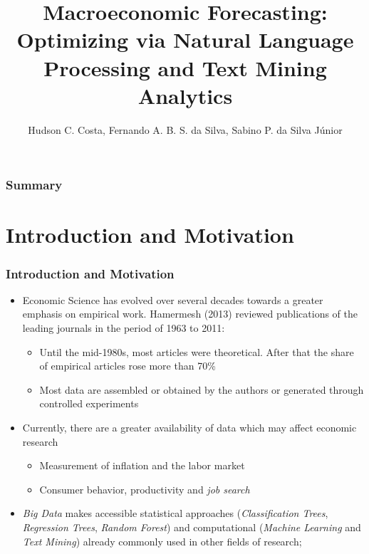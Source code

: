 \documentclass[aspectratio=169]{beamer}
\title[\sc{}]{Macroeconomic Forecasting: Optimizing via Natural Language Processing and Text Mining Analytics}
\author{Hudson C. Costa, Fernando A. B. S. da Silva, Sabino P. da Silva Júnior}
\institute{Data Pier and IBMEC/MG, Department of Statistics/UFRGS, PPGE/UFRGS}
\date{}
\begin{document}



\begin{frame}
  \titlepage
\end{frame}

\begin{frame}[plain]\frametitle{Summary}
\small\tableofcontents
\end{frame}

\section{Introduction and Motivation}

\begin{frame}\frametitle{Introduction and Motivation}
  \begin{itemize}
  \item Economic Science has evolved over several decades towards a greater emphasis on empirical work. Hamermesh (2013) reviewed publications of the leading journals in the period of 1963 to 2011:
  
    \begin{itemize}
      \item Until the mid-1980s, most articles were theoretical. After that the share of empirical articles rose more than 70\% 
      \item Most data are assembled or obtained by the authors or generated through controlled experiments 
    \end{itemize}
  \item Currently, there are a greater availability of data which may affect economic research
    \begin{itemize}
      \item Measurement of inflation and the labor market
       \item  Consumer behavior, productivity and \emph{job search}
    \end{itemize}
  \item \emph{Big Data} makes accessible statistical approaches (\emph{Classification Trees}, \emph{Regression Trees}, \emph{Random Forest}) and computational (\emph{Machine Learning} and \emph{Text Mining}) already commonly used in other fields of research;
  \end{itemize}
\end{frame}
\end{document}
